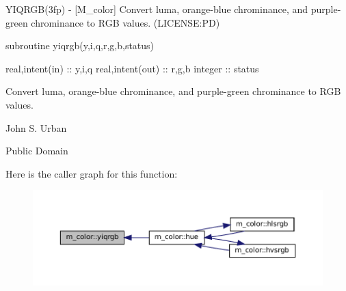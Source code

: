 \begin{DoxyDescription}
\item[\label{_YIQRGB}%
N\+A\+ME ]Y\+I\+Q\+R\+G\+B(3fp) -\/ \mbox{[}M\+\_\+color\mbox{]} Convert luma, orange-\/blue chrominance, and purple-\/green chrominance to R\+GB values. (L\+I\+C\+E\+N\+SE\+:PD) 


\item[S\+Y\+N\+O\+P\+S\+IS ]
\begin{DoxyPre}
    subroutine yiqrgb(y,i,q,r,g,b,status)\end{DoxyPre}



\begin{DoxyPre}     real,intent(in)  :: y,i,q
     real,intent(out) :: r,g,b
     integer          :: status
    \end{DoxyPre}
 


\item[D\+E\+S\+C\+R\+I\+P\+T\+I\+ON ]

Convert luma, orange-\/blue chrominance, and purple-\/green chrominance to R\+GB values.




\item[A\+U\+T\+H\+OR ]

John S. Urban




\item[L\+I\+C\+E\+N\+SE ]

Public Domain




\end{DoxyDescription}Here is the caller graph for this function\+:
\nopagebreak
\begin{figure}[H]
\begin{center}
\leavevmode
\includegraphics[width=350pt]{namespacem__color_ac9cd845fb9975144a6deb3a21ce29a29_icgraph}
\end{center}
\end{figure}

